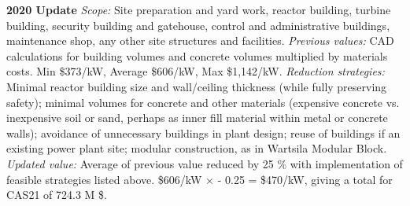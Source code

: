  \textbf{2020 Update} 
\emph{Scope: } 
Site preparation and yard work, reactor building, turbine building, security building and gatehouse, control and administrative buildings, maintenance shop, any other site structures and facilities. 
 \emph{Previous values:} CAD calculations for building volumes and concrete volumes multiplied by materials costs. 
Min \$373/kW, Average \$606/kW, Max \$1,142/kW. 
\emph{Reduction strategies: } 
Minimal reactor building size and wall/ceiling thickness (while fully preserving safety); minimal volumes for concrete and other materials (expensive concrete vs. inexpensive soil or sand, perhaps as inner fill material within metal or concrete walls); avoidance of unnecessary buildings in plant design; reuse of buildings if an existing power plant site; modular construction, as in Wartsila Modular Block. 
\emph{Updated value: } 
Average of previous value reduced by 25 \% with implementation of feasible strategies listed above. \$606/kW $\times$ - 0.25 = \$470/kW, giving a total for CAS21 of 724.3 M \$. 

